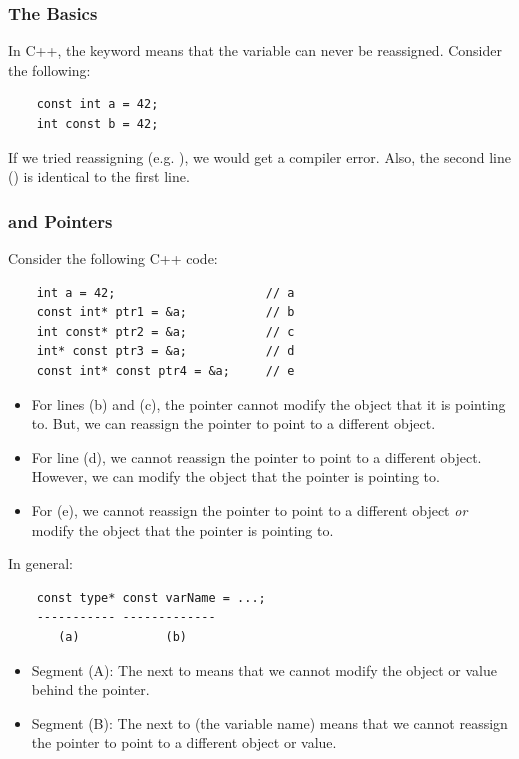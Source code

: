 \documentclass[letterpaper]{article}
\begin{document}
\subsubsection{The Basics}
In C++, the  keyword means that the variable can never be reassigned. Consider the following: 
\begin{verbatim}
    const int a = 42; 
    int const b = 42;
\end{verbatim}
If we tried reassigning  (e.g. ), we would get a compiler error. Also, the second line () is identical to the first line. 

\subsubsection{ and Pointers}
Consider the following C++ code: 
\begin{verbatim}
    int a = 42;                     // a 
    const int* ptr1 = &a;           // b
    int const* ptr2 = &a;           // c
    int* const ptr3 = &a;           // d
    const int* const ptr4 = &a;     // e
\end{verbatim}
\begin{itemize}
    \item For lines (b) and (c), the pointer cannot modify the object that it is pointing to.  But, we can reassign the pointer to point to a different object. 
    \item For line (d), we cannot reassign the pointer to point to a different object. However, we can modify the object that the pointer is pointing to. 
    \item For (e), we cannot reassign the pointer to point to a different object \emph{or} modify the object that the pointer is pointing to. 
\end{itemize}
In general:
\begin{verbatim}
    const type* const varName = ...; 
    ----------- -------------
       (a)            (b)
\end{verbatim}
\begin{itemize}
    \item Segment (A): The  next to  means that we cannot modify the object or value behind the pointer. 
    \item Segment (B): The  next to  (the variable name) means that we cannot reassign the pointer to point to a different object or value. 
\end{itemize}
\end{document}
